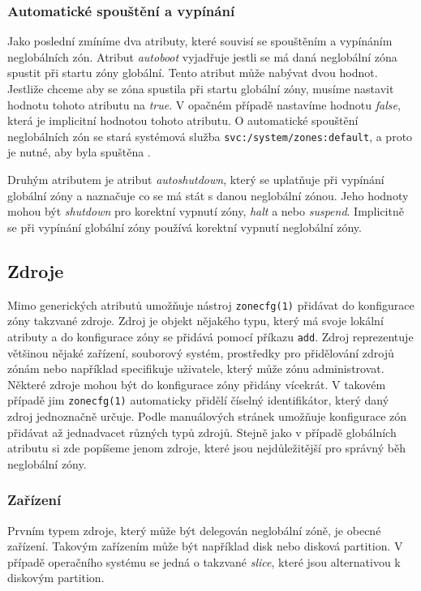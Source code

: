 \subsubsection{Automatické spouštění a vypínání}
\label{chapter:zones:configuration:global_attributes:autoboot}
Jako poslední zmíníme dva atributy, které souvisí se spouštěním a vypínáním neglobálních zón. Atribut \textit{autoboot} vyjadřuje
jestli se má daná neglobální zóna spustit při startu zóny globální. Tento atribut může nabývat dvou hodnot. Jestliže chceme
aby se zóna spustila při startu globální zóny, musíme nastavit hodnotu tohoto atributu na \textit{true}. V opačném případě
nastavíme hodnotu \textit{false}, která je implicitní hodnotou tohoto atributu. O automatické spouštění neglobálních zón se
stará systémová služba \verb|svc:/system/zones:default|, a proto je nutné, aby byla spuštěna \cite{oracle:manpages:zonecfg}.

Druhým atributem je atribut \textit{autoshutdown}, který se uplatňuje při vypínání globální zóny a naznačuje co se má stát
s danou neglobální zónou. Jeho hodnoty mohou být \textit{shutdown} pro korektní vypnutí zóny, \textit{halt} a nebo \textit{suspend}.
Implicitně se při vypínání globální zóny používá korektní vypnutí neglobální zóny.
\subsection{Zdroje}
\label{chapter:zones:configuration:resources}
Mimo generických atributů umožňuje nástroj \verb|zonecfg(1)| přidávat do konfigurace zóny takzvané zdroje. Zdroj je objekt
nějakého typu, který má svoje lokální atributy a do konfigurace zóny se přidává pomocí příkazu \verb|add|. Zdroj reprezentuje
většinou nějaké zařízení, souborový systém, prostředky pro přidělování zdrojů zónám nebo například specifikuje uživatele,
který může zónu administrovat. Některé zdroje mohou být do konfigurace zóny přidány vícekrát. V takovém případě jim \verb|zonecfg(1)|
automaticky přidělí číselný identifikátor, který daný zdroj jednoznačně určuje. Podle manuálových stránek \cite{oracle:manpages:zonecfg}
umožňuje konfigurace zón přidávat až jednadvacet různých typů zdrojů. Stejně jako v případě globálních atributu si zde
popíšeme jenom zdroje, které jsou nejdůležitější pro správný běh neglobální zóny.
\subsubsection{Zařízení}
\label{chapter:zones:configuration:resources:device}
Prvním typem zdroje, který může být delegován neglobální zóně, je obecné zařízení. Takovým zařízením může být například disk
nebo disková partition. V případě operačního systému se jedná o takzvané \textit{slice}, které jsou alternativou k diskovým 
partition. 

